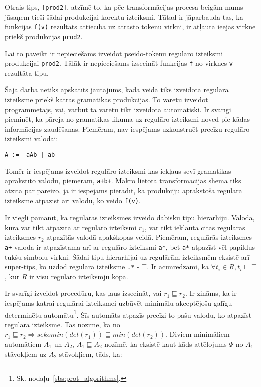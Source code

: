 Otrais tips, \verb|[prod2]|, atzīmē to, ka pēc transformācijas procesa beigām mums jāsaņem tieši šādai produkcijai korektu izteiksmi. Tātad ir jāparbauda tas, ka funkcijas \verb|f(v)| rezultāts attiecībā uz atrasto tokenu virkni, ir atļauta ieejas virkne priekš produkcijas \verb|prod2|.

Lai to paveikt ir nepieciešams izveidot pseido-tokenu regulāro izteiksmi produkcijai \verb|prod2|. Tālāk ir nepieciešams izsecināt funkcijas \verb|f| no virknes \verb|v| rezultāta tipu.


Šajā darbā netiks apskatīts jautājums, kādā veidā tiks izveidota regulārā izteiksme priekš katras gramatikas produkcijas. To varētu izveidot programmētājs, vai, varbūt tā varētu tikt izveidota automātiski. Ir svarīgi pieminēt, ka pāreja no gramatikas likuma uz regulāro izteiksmi noved pie kādas informācijas zaudēšanas. Piemēram, nav iespējams uzkonstruēt precīzu regulāro izteiksmi valodai:

\begin{verbatim}
A :=  aAb | ab
\end{verbatim}

Tomēr ir iespējams izveidot regulāro izteiksmi kas iekļaus sevī gramatikas aprakstīto valodu, piemēram, \verb|a+b+|. Makro lietotā transformācijas shēma tiks atzīta par pareizo, ja ir iespējams pierādīt, ka produkciju aprakstošā regulārā izteiksme atpazīst arī valodu, ko veido \verb|f(v)|.

Ir viegli pamanīt, ka regulārās izteiksmes izveido dabisku tipu hierarhiju. Valoda, kura var tikt atpazīta ar regulāro izteiksmi $r_1$, var tikt iekļauta citas regulārās izteiksmes $r_2$ atpazītās valodā apakškopas veidā. Piemēram, regulārās izteiksmes \verb|a+| valoda ir atpazīstama arī ar regulāro izteiksmi \verb|a*|, bet \verb|a*| atpazīst vēl papildus tukšu simbolu virkni. Šādai tipu hierarhijai uz regulārām izteiksmēm eksistē arī super-tips, ko uzdod regulārā izteiksme \verb|.*| - $\top$. Ir acīmredzami, ka $\forall t_i \in R, t_i \sqsubseteq \top$, kur $R$ ir visu regulāro izteiksmju kopa.

Ir svarīgi izveidot procedūru, kas ļaus izsecināt, vai $r_1 {\sqsubseteq} r_2$. Ir zināms, ka ir iespējams katrai regulārai izteiksmei uzbūvēt minimālu akceptējošu galīgu determinētu automātu\footnote{Sk. nodaļu~\ref{sbs:prot_algorithms}.}. Šīs automāts atpazīs precīzi to pašu valodu, ko atpazīst regulārā izteiksme. Tas nozīmē, ka no $r_1 \sqsubseteq r_2 \Rightarrow seko min (det (r_1)) \sqsubseteq min (det (r_2))$. Diviem minimāliem automātiem $A_1$ un $A_2$, $A_1 \sqsubseteq A_2$ nozīmē, ka eksistē kaut kāds attēlojums $\Psi$ no $A_1$ stāvokļiem uz $A_2$ stāvokļiem, tāds, ka:

